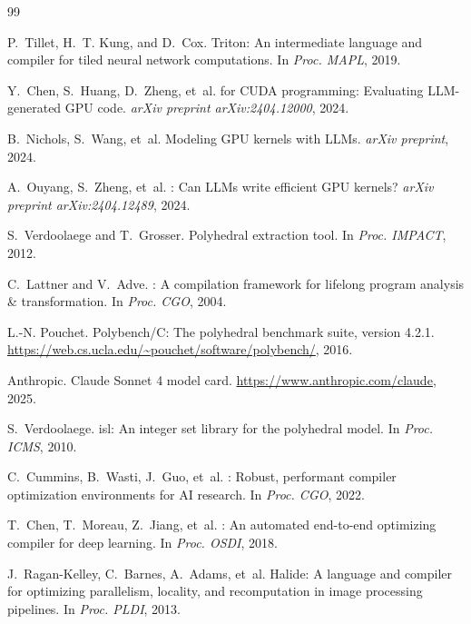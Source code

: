\documentclass[sigconf]{acmart}
\begin{document}

\begin{thebibliography}{99}

P.~Tillet, H.~T. Kung, and D.~Cox.
\newblock Triton: An intermediate language and compiler for tiled neural
  network computations.
\newblock In \emph{Proc. MAPL}, 2019.

Y.~Chen, S.~Huang, D.~Zheng, et~al.
 for {CUDA} programming: Evaluating {LLM}-generated {GPU}
  code.
\newblock \emph{arXiv preprint arXiv:2404.12000}, 2024.

B.~Nichols, S.~Wang, et~al.
\newblock Modeling {GPU} kernels with {LLMs}.
\newblock \emph{arXiv preprint}, 2024.

A.~Ouyang, S.~Zheng, et~al.
: Can {LLMs} write efficient {GPU} kernels?
\newblock \emph{arXiv preprint arXiv:2404.12489}, 2024.

S.~Verdoolaege and T.~Grosser.
\newblock Polyhedral extraction tool.
\newblock In \emph{Proc. IMPACT}, 2012.

C.~Lattner and V.~Adve.
: A compilation framework for lifelong program analysis \&
  transformation.
\newblock In \emph{Proc. CGO}, 2004.

L.-N. Pouchet.
\newblock Polybench/C: The polyhedral benchmark suite, version 4.2.1.
\newblock \url{https://web.cs.ucla.edu/~pouchet/software/polybench/}, 2016.

Anthropic.
\newblock Claude {Sonnet} 4 model card.
\newblock \url{https://www.anthropic.com/claude}, 2025.

S.~Verdoolaege.
\newblock isl: An integer set library for the polyhedral model.
\newblock In \emph{Proc. ICMS}, 2010.

C.~Cummins, B.~Wasti, J.~Guo, et~al.
: Robust, performant compiler optimization
  environments for {AI} research.
\newblock In \emph{Proc. CGO}, 2022.

T.~Chen, T.~Moreau, Z.~Jiang, et~al.
: An automated end-to-end optimizing compiler for deep
  learning.
\newblock In \emph{Proc. OSDI}, 2018.

J.~Ragan-Kelley, C.~Barnes, A.~Adams, et~al.
\newblock Halide: A language and compiler for optimizing parallelism,
  locality, and recomputation in image processing pipelines.
\newblock In \emph{Proc. PLDI}, 2013.


\end{thebibliography}
\end{document}
